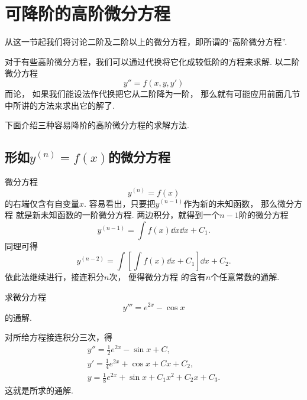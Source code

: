 \section{可降阶的高阶微分方程}
从这一节起我们将讨论二阶及二阶以上的微分方程，即所谓的“高阶微分方程”.

对于有些高阶微分方程，我们可以通过代换将它化成较低阶的方程来求解.
以二阶微分方程\begin{equation}\label{equation:微分方程.二阶微分方程.1111型}
	y'' = f(x,y,y')
\end{equation}而论，
如果我们能设法作代换把它从二阶降为一阶，
那么就有可能应用前面几节中所讲的方法来求出它的解了.

下面介绍三种容易降阶的高阶微分方程的求解方法.

\subsection{\texorpdfstring{形如\(y^{(n)} = f(x)\)}{由自变量确定n阶导数}的微分方程}
微分方程\begin{equation}\label{equation:微分方程.简单高阶微分方程}
	y^{(n)} = f(x)
\end{equation}的右端仅含有自变量\(x\).
容易看出，只要把\(y^{(n-1)}\)作为新的未知函数，
那么微分方程  就是新未知函数的一阶微分方程.
两边积分，就得到一个\(n-1\)阶的微分方程\begin{equation*}
	y^{(n-1)} = \int f(x) \dd{x} \dd{x} + C_1.
\end{equation*}
同理可得\begin{equation*}
	y^{(n-2)} = \int \left[ \int f(x) \dd{x} + C_1 \right] \dd{x} + C_2.
\end{equation*}
依此法继续进行，接连积分\(n\)次，
便得微分方程  的含有\(n\)个任意常数的通解.

\begin{example}
求微分方程\begin{equation*}
	y''' = e^{2x} - \cos x
\end{equation*}的通解.
\begin{solution}
对所给方程接连积分三次，得\begin{gather*}
	y'' = \frac{1}{2} e^{2x} - \sin x + C, \\
	y' = \frac{1}{4} e^{2x} + \cos x + C x + C_2, \\
	y = \frac{1}{8} e^{2x} + \sin x + C_1 x^2 + C_2 x + C_3.
\end{gather*}
这就是所求的通解.
\end{solution}
\end{example}

